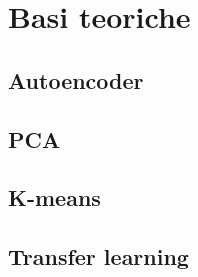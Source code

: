 \chapter{Basi teoriche}
\label{cap:teoria}

\section{Autoencoder}

\section{PCA}

\section{K-means}

\section{Transfer learning}